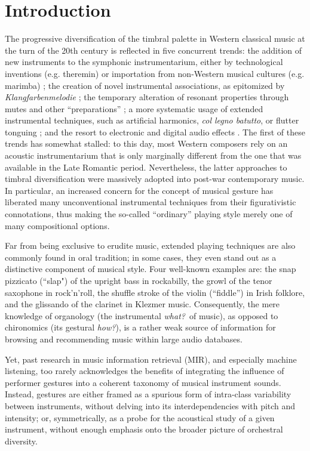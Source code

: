 \documentclass{article}
\makeatletter
\newcommand*{\eg}{e.g.\@\xspace}
\makeatother
\begin{document}
\section{Introduction}\label{sec:introduction}
The progressive diversification of the timbral palette in Western classical music at the turn of the 20th century is reflected in five concurrent trends:
the addition of new instruments to the symphonic instrumentarium, either by technological inventions (\eg theremin) or importation from non-Western musical cultures (\eg marimba) \cite{sachs2012book};
the creation of novel instrumental associations, as epitomized by \emph{Klangfarbenmelodie} \cite{schoenberg2010book};
the temporary alteration of resonant properties through mutes and other ``preparations'' \cite{dianova2007phd};
a more systematic usage of extended instrumental techniques, such as artificial harmonics, \emph{col legno batutto}, or flutter tonguing \cite{kostka2016book};
and the resort to electronic and digital audio effects \cite{zolzer2011dafx}.
The first of these trends has somewhat stalled: to this day, most Western composers rely on an acoustic instrumentarium that is only marginally different from the one that was available in the Late Romantic period.
Nevertheless, the latter approaches to timbral diversification were massively adopted into post-war contemporary music.
In particular, an increased concern for the concept of musical gesture \cite{godoy2009book} has liberated many unconventional instrumental techniques from their figurativistic connotations, thus making the so-called ``ordinary'' playing style merely one of many compositional options.


Far from being exclusive to erudite music, extended playing techniques are also commonly found in oral tradition; in some cases, they even stand out as a distinctive component of musical style.
Four well-known examples are:
the snap pizzicato (``slap") of the upright bass in rockabilly,
the growl of the tenor saxophone in rock'n'roll,
the shuffle stroke of the violin (``fiddle'') in Irish folklore,
and the glissando of the clarinet in Klezmer music.
Consequently, the mere knowledge of organology (the instrumental \emph{what?}~of music), as opposed to chironomics (its gestural \emph{how?}), is a rather weak source of information for browsing and recommending music within large audio databases.


Yet, past research in music information retrieval (MIR), and especially machine listening, too rarely acknowledges the benefits of integrating the influence of performer gestures into a coherent taxonomy of musical instrument sounds.
Instead, gestures are either framed as a spurious form of intra-class variability between instruments, without delving into its interdependencies with pitch and intensity;
or, symmetrically, as a probe for the acoustical study of a given instrument, without enough emphasis onto the broader picture of orchestral diversity.
\end{document}
